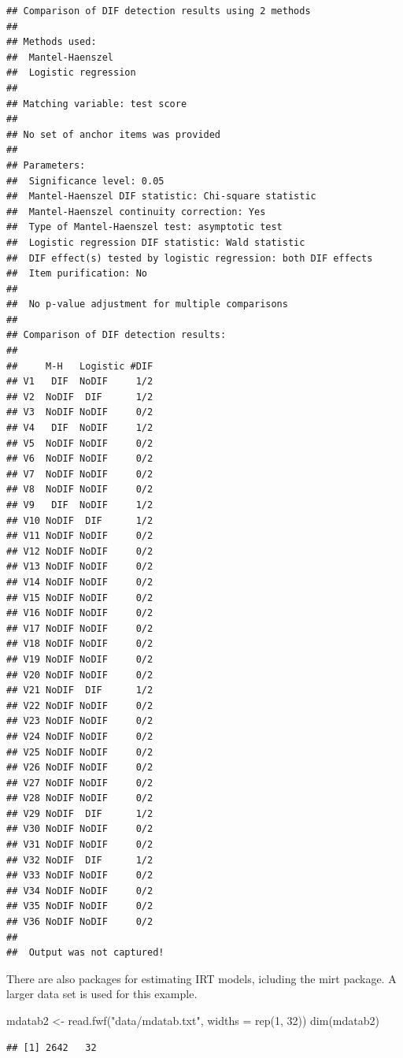 \documentclass[
]{book}
\newenvironment{Shaded}{\begin{snugshade}}{\end{snugshade}}
\newcommand{\AttributeTok}[1]{\textcolor[rgb]{0.77,0.63,0.00}{#1}}
\newcommand{\DecValTok}[1]{\textcolor[rgb]{0.00,0.00,0.81}{#1}}
\newcommand{\FunctionTok}[1]{\textcolor[rgb]{0.00,0.00,0.00}{#1}}
\newcommand{\NormalTok}[1]{#1}
\newcommand{\OtherTok}[1]{\textcolor[rgb]{0.56,0.35,0.01}{#1}}
\newcommand{\StringTok}[1]{\textcolor[rgb]{0.31,0.60,0.02}{#1}}
\begin{document}
\begin{verbatim}
## Comparison of DIF detection results using 2 methods 
##  
## Methods used: 
##  Mantel-Haenszel
##  Logistic regression
## 
## Matching variable: test score 
##  
## No set of anchor items was provided 
##  
## Parameters: 
##  Significance level: 0.05
##  Mantel-Haenszel DIF statistic: Chi-square statistic 
##  Mantel-Haenszel continuity correction: Yes 
##  Type of Mantel-Haenszel test: asymptotic test 
##  Logistic regression DIF statistic: Wald statistic 
##  DIF effect(s) tested by logistic regression: both DIF effects 
##  Item purification: No 
##  
##  No p-value adjustment for multiple comparisons 
##  
## Comparison of DIF detection results: 
##  
##     M-H   Logistic #DIF 
## V1   DIF  NoDIF     1/2 
## V2  NoDIF  DIF      1/2 
## V3  NoDIF NoDIF     0/2 
## V4   DIF  NoDIF     1/2 
## V5  NoDIF NoDIF     0/2 
## V6  NoDIF NoDIF     0/2 
## V7  NoDIF NoDIF     0/2 
## V8  NoDIF NoDIF     0/2 
## V9   DIF  NoDIF     1/2 
## V10 NoDIF  DIF      1/2 
## V11 NoDIF NoDIF     0/2 
## V12 NoDIF NoDIF     0/2 
## V13 NoDIF NoDIF     0/2 
## V14 NoDIF NoDIF     0/2 
## V15 NoDIF NoDIF     0/2 
## V16 NoDIF NoDIF     0/2 
## V17 NoDIF NoDIF     0/2 
## V18 NoDIF NoDIF     0/2 
## V19 NoDIF NoDIF     0/2 
## V20 NoDIF NoDIF     0/2 
## V21 NoDIF  DIF      1/2 
## V22 NoDIF NoDIF     0/2 
## V23 NoDIF NoDIF     0/2 
## V24 NoDIF NoDIF     0/2 
## V25 NoDIF NoDIF     0/2 
## V26 NoDIF NoDIF     0/2 
## V27 NoDIF NoDIF     0/2 
## V28 NoDIF NoDIF     0/2 
## V29 NoDIF  DIF      1/2 
## V30 NoDIF NoDIF     0/2 
## V31 NoDIF NoDIF     0/2 
## V32 NoDIF  DIF      1/2 
## V33 NoDIF NoDIF     0/2 
## V34 NoDIF NoDIF     0/2 
## V35 NoDIF NoDIF     0/2 
## V36 NoDIF NoDIF     0/2 
## 
##  Output was not captured!
\end{verbatim}

There are also packages for estimating IRT models, icluding the mirt package. A larger data set is used for this example.

\begin{Shaded}
\begin{Highlighting}[]
\NormalTok{mdatab2 }\OtherTok{\textless{}{-}} \FunctionTok{read.fwf}\NormalTok{(}\StringTok{"data/mdatab.txt"}\NormalTok{, }\AttributeTok{widths =} \FunctionTok{rep}\NormalTok{(}\DecValTok{1}\NormalTok{, }\DecValTok{32}\NormalTok{))}
\FunctionTok{dim}\NormalTok{(mdatab2)}
\end{Highlighting}
\end{Shaded}

\begin{verbatim}
## [1] 2642   32
\end{verbatim}
\end{document}
